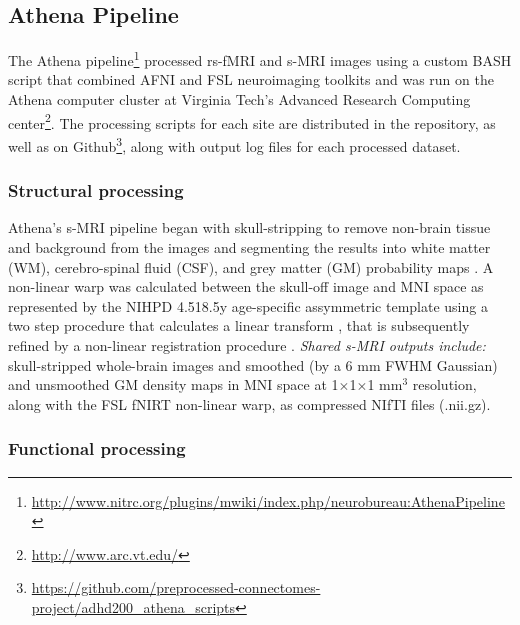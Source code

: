 \documentclass[preprint,12pt,3p]{elsarticle}
\begin{document}
\subsection{Athena Pipeline} 
The Athena pipeline\footnote{\url{http://www.nitrc.org/plugins/mwiki/index.php/neurobureau:AthenaPipeline}} processed rs-fMRI and s-MRI images using a custom BASH script that combined AFNI \cite{cox1996afni} and FSL \cite{smith2004advances} neuroimaging toolkits and was run on the Athena computer cluster at Virginia Tech's Advanced Research Computing center\footnote{\url{http://www.arc.vt.edu/}}. The processing scripts for each site are distributed in the repository, as well as on Github\footnote{\url{https://github.com/preprocessed-connectomes-project/adhd200_athena_scripts}}, along with output log files for each processed dataset.

\subsubsection{Structural processing} Athena's s-MRI pipeline began with skull-stripping to remove non-brain tissue and background from the images \cite{smith2002_bet} and segmenting the results into white matter (WM), cerebro-spinal fluid (CSF), and grey matter (GM) probability maps \cite{zhang2001_fast}. A non-linear warp was calculated between the skull-off image and MNI space as represented by the NIHPD 4.5\textendash18.5y age-specific assymmetric template \cite{fonov2011unbiased} using a two step procedure that calculates a linear transform \cite{jenkinson2002_flirt}, that is subsequently refined by a non-linear registration procedure \cite{andersson2007non}. \emph{Shared s-MRI outputs include:} skull-stripped whole-brain images and smoothed (by a 6 mm FWHM Gaussian) and unsmoothed GM density maps in MNI space at 1$\times$1$\times$1 mm$^3$ resolution, along with the FSL fNIRT non-linear warp, as compressed NIfTI files (.nii.gz). 

\subsubsection{Functional processing} 
\end{document}
